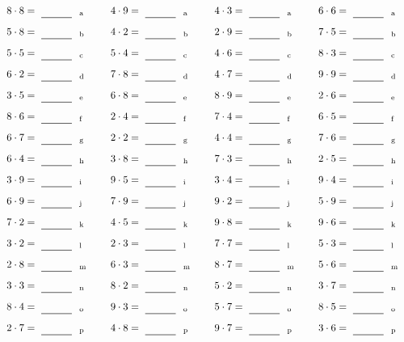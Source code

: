 \documentclass
[
  draft    = true,
  fontsize = 11pt,
  parskip  = half-
]
{scrartcl}
\begin{document}
\par\vfill\par
\begin{align*}
    \pline{8\cdot8}&=\rline{a}
  & \pline{4\cdot9}&=\rline{a}
  & \pline{4\cdot3}&=\rline{a}
  & \pline{6\cdot6}&=\rline{a} \\[1ex]
    \pline{5\cdot8}&=\rline{b}
  & \pline{4\cdot2}&=\rline{b}
  & \pline{2\cdot9}&=\rline{b}
  & \pline{7\cdot5}&=\rline{b} \\[1ex]
    \pline{5\cdot5}&=\rline{c}
  & \pline{5\cdot4}&=\rline{c}
  & \pline{4\cdot6}&=\rline{c}
  & \pline{8\cdot3}&=\rline{c} \\[1ex]
    \pline{6\cdot2}&=\rline{d}
  & \pline{7\cdot8}&=\rline{d}
  & \pline{4\cdot7}&=\rline{d}
  & \pline{9\cdot9}&=\rline{d} \\[1ex]
    \pline{3\cdot5}&=\rline{e}
  & \pline{6\cdot8}&=\rline{e}
  & \pline{8\cdot9}&=\rline{e}
  & \pline{2\cdot6}&=\rline{e} \\[1ex]
    \pline{8\cdot6}&=\rline{f}
  & \pline{2\cdot4}&=\rline{f}
  & \pline{7\cdot4}&=\rline{f}
  & \pline{6\cdot5}&=\rline{f} \\[1ex]
    \pline{6\cdot7}&=\rline{g}
  & \pline{2\cdot2}&=\rline{g}
  & \pline{4\cdot4}&=\rline{g}
  & \pline{7\cdot6}&=\rline{g} \\[1ex]
    \pline{6\cdot4}&=\rline{h}
  & \pline{3\cdot8}&=\rline{h}
  & \pline{7\cdot3}&=\rline{h}
  & \pline{2\cdot5}&=\rline{h} \\[1ex]
    \pline{3\cdot9}&=\rline{i}
  & \pline{9\cdot5}&=\rline{i}
  & \pline{3\cdot4}&=\rline{i}
  & \pline{9\cdot4}&=\rline{i} \\[1ex]
    \pline{6\cdot9}&=\rline{j}
  & \pline{7\cdot9}&=\rline{j}
  & \pline{9\cdot2}&=\rline{j}
  & \pline{5\cdot9}&=\rline{j} \\[1ex]
    \pline{7\cdot2}&=\rline{k}
  & \pline{4\cdot5}&=\rline{k}
  & \pline{9\cdot8}&=\rline{k}
  & \pline{9\cdot6}&=\rline{k} \\[1ex]
    \pline{3\cdot2}&=\rline{l}
  & \pline{2\cdot3}&=\rline{l}
  & \pline{7\cdot7}&=\rline{l}
  & \pline{5\cdot3}&=\rline{l} \\[1ex]
    \pline{2\cdot8}&=\rline{m}
  & \pline{6\cdot3}&=\rline{m}
  & \pline{8\cdot7}&=\rline{m}
  & \pline{5\cdot6}&=\rline{m} \\[1ex]
    \pline{3\cdot3}&=\rline{n}
  & \pline{8\cdot2}&=\rline{n}
  & \pline{5\cdot2}&=\rline{n}
  & \pline{3\cdot7}&=\rline{n} \\[1ex]
    \pline{8\cdot4}&=\rline{o}
  & \pline{9\cdot3}&=\rline{o}
  & \pline{5\cdot7}&=\rline{o}
  & \pline{8\cdot5}&=\rline{o} \\[1ex]
    \pline{2\cdot7}&=\rline{p}
  & \pline{4\cdot8}&=\rline{p}
  & \pline{9\cdot7}&=\rline{p}
  & \pline{3\cdot6}&=\rline{p}
\end{align*}
\end{document}
